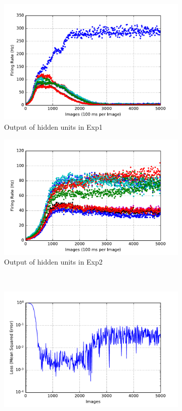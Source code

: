 \begin{figure}
\begin{subfigure}[t]{0.4\textwidth}
		\includegraphics[width=\textwidth]{pics_sdlm/10_exp_SRBM_Orig/exp1_hid_s.pdf}
		\caption{Output of hidden units in Exp1}
	\end{subfigure}
	\begin{subfigure}[t]{0.4\textwidth}
		\includegraphics[width=\textwidth]{pics_sdlm/10_exp_SRBM_Orig/exp2_hid_s.pdf}
		\caption{Output of hidden units in Exp2}
	\end{subfigure}\\
	\begin{subfigure}[t]{0.4\textwidth}
		\includegraphics[width=\textwidth]{pics_sdlm/10_exp_SRBM_Orig/exp1_mse_nons.pdf}

\end{subfigure}
\end{figure}
